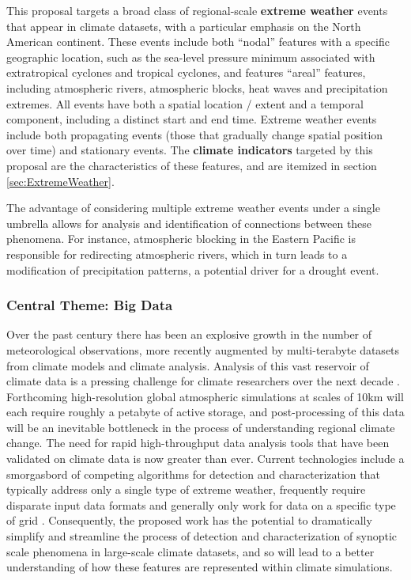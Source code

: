 \documentclass[11pt]{article}
\newcommand\citep{\cite}
\begin{document}
This proposal targets a broad class of regional-scale \textbf{extreme weather} events that appear in climate datasets, with a particular emphasis on the North American continent.  These events include both ``nodal'' features with a specific geographic location, such as the sea-level pressure minimum associated with extratropical cyclones and tropical cyclones, and features ``areal'' features, including atmospheric rivers, atmospheric blocks, heat waves and precipitation extremes.  All events have both a spatial location / extent and a temporal component, including a distinct start and end time.  Extreme weather events include both propagating events (those that gradually change spatial position over time) and stationary events.  The \textbf{climate indicators} targeted by this proposal are the characteristics of these features, and are itemized in section \ref{sec:ExtremeWeather}.

The advantage of considering multiple extreme weather events under a single umbrella allows for analysis and identification of connections between these phenomena.  For instance, atmospheric blocking in the Eastern Pacific is responsible for redirecting atmospheric rivers, which in turn leads to a modification of precipitation patterns, a potential driver for a drought event.

\subsubsection{Central Theme: Big Data}

Over the past century there has been an explosive growth in the number of meteorological observations, more recently augmented by multi-terabyte datasets from climate models and climate analysis.  Analysis of this vast reservoir of climate data is a pressing challenge for climate researchers over the next decade \citep{levy2012bigdata, ganguly2008data}.  Forthcoming high-resolution global atmospheric simulations at scales of 10km will each require roughly a petabyte of active storage, and post-processing of this data will be an inevitable bottleneck in the process of understanding regional climate change.  The need for rapid high-throughput data analysis tools that have been validated on climate data is now greater than ever.  Current technologies include a smorgasbord of competing algorithms for detection and characterization that typically address only a single type of extreme weather, frequently require disparate input data formats and generally only work for data on a specific type of grid \citep{neu2013imilast}.  Consequently, the proposed work has the potential to dramatically simplify and streamline the process of detection and characterization of synoptic scale phenomena in large-scale climate datasets, and so will lead to a better understanding of how these features are represented within climate simulations.
\end{document}
